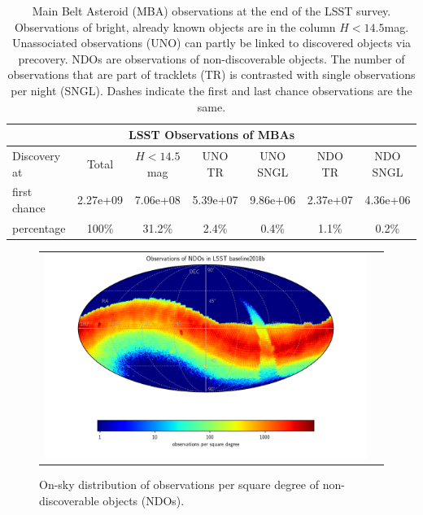 \begin{table}[tb!]
\begin{center}
\begin{tabular}{lcccccc}
\multicolumn{7}{c}{LSST Observations of MBAs}\\
\hline
Discovery at & Total & $H<14.5$mag & \gls{UNO} TR & \gls{UNO} SNGL & \gls{NDO} TR & \gls{NDO} SNGL \\
\hline
first chance & 2.27e+09 & 7.06e+08 & 5.39e+07 & 9.86e+06 & 2.37e+07 & 4.36e+06 \\
percentage   & 100\%  & 31.2\% & 2.4\% & 0.4\% & 1.1\% & 0.2\% \\\hline
\hline
\end{tabular}
\end{center}
\caption{Main Belt Asteroid (\gls{MBA}) observations at the end of the \gls{LSST} survey. Observations of bright, already known objects are in the column $H<14.5$mag.
Unassociated observations (\gls{UNO}) can partly be linked to discovered objects via \gls{precovery}. NDOs are observations of non-discoverable objects. The number of observations that are part of tracklets (TR) is contrasted with single observations per night (SNGL). Dashes indicate the first and last chance observations are the same.\label{tab:mbaobs}}
\end{table}

\begin{figure}[tb!]
\begin{center}
\begin{tabular}{cc}
\includegraphics[width=0.80\linewidth]{figs/mba_obs_hp_ndo.png} &
\end{tabular}
\end{center}
\caption{On-sky distribution of observations per square degree of non-discoverable objects (NDOs).  }
\label{fig:ndo_obs_sky}       %
\end{figure}


